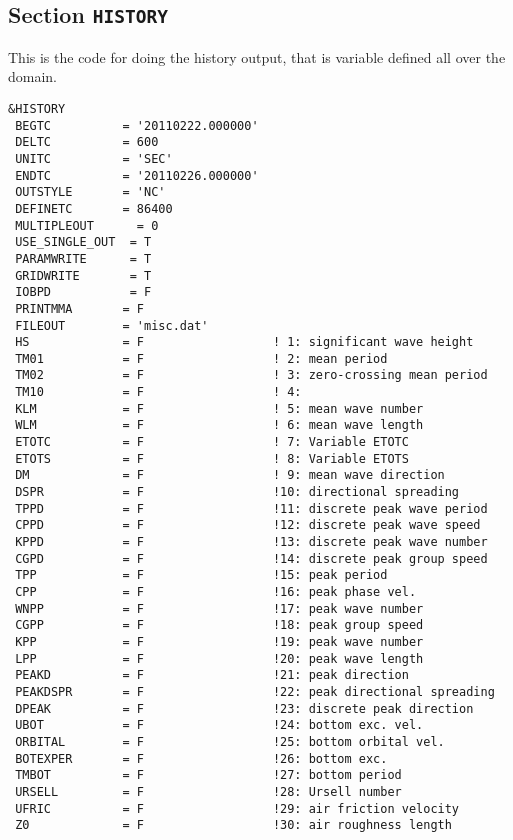 \documentclass[12pt]{amsart}
\begin{document}
\newpage

\subsection{Section {\tt HISTORY}}
This is the code for doing the history output, that is variable defined all over the domain.
\begin{verbatim}
&HISTORY
 BEGTC          = '20110222.000000'
 DELTC          = 600          
 UNITC          = 'SEC'        
 ENDTC          = '20110226.000000'
 OUTSTYLE       = 'NC'       
 DEFINETC       = 86400      
 MULTIPLEOUT      = 0        
 USE_SINGLE_OUT  = T         
 PARAMWRITE      = T       
 GRIDWRITE       = T       
 IOBPD           = F       
 PRINTMMA       = F        
 FILEOUT        = 'misc.dat'
 HS             = F                  ! 1: significant wave height
 TM01           = F                  ! 2: mean period
 TM02           = F                  ! 3: zero-crossing mean period
 TM10           = F                  ! 4: 
 KLM            = F                  ! 5: mean wave number
 WLM            = F                  ! 6: mean wave length
 ETOTC          = F                  ! 7: Variable ETOTC
 ETOTS          = F                  ! 8: Variable ETOTS
 DM             = F                  ! 9: mean wave direction
 DSPR           = F                  !10: directional spreading
 TPPD           = F                  !11: discrete peak wave period
 CPPD           = F                  !12: discrete peak wave speed
 KPPD           = F                  !13: discrete peak wave number
 CGPD           = F                  !14: discrete peak group speed
 TPP            = F                  !15: peak period  
 CPP            = F                  !16: peak phase vel. 
 WNPP           = F                  !17: peak wave number
 CGPP           = F                  !18: peak group speed
 KPP            = F                  !19: peak wave number
 LPP            = F                  !20: peak wave length 
 PEAKD          = F                  !21: peak direction
 PEAKDSPR       = F                  !22: peak directional spreading
 DPEAK          = F                  !23: discrete peak direction 
 UBOT           = F                  !24: bottom exc. vel. 
 ORBITAL        = F                  !25: bottom orbital vel. 
 BOTEXPER       = F                  !26: bottom exc.  
 TMBOT          = F                  !27: bottom period 
 URSELL         = F                  !28: Ursell number
 UFRIC          = F                  !29: air friction velocity
 Z0             = F                  !30: air roughness length

\end{verbatim}
\end{document}
